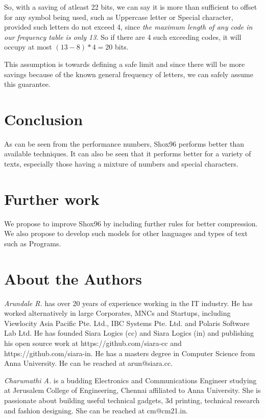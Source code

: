 \documentclass[]{article}
\begin{document}
So, with a saving of atleast 22 bits, we can say it is more than sufficient to offset for any symbol being used, such as Uppercase letter or Special character, provided such letters do not exceed 4, since \emph{the maximum length of any code in our frequency table is only 13}.  So if there are 4 such exceeding codes, it will occupy at most $(13 - 8) * 4 = 20$ bits.

This assumption is towards defining a safe limit and since there will be more savings because of the known general frequency of letters, we can safely assume this guarantee.

\section{Conclusion}

As can be seen from the performance numbers, Shox96 performs better than available techniques.  It can also be seen that it performs better for a variety of texts, especially those having a mixture of numbers and special characters.

\section{Further work}

We propose to improve Shox96 by including further rules for better compression.  We also propose to develop such models for other languages and types of text such as Programs.

\section{About the Authors}

\emph{Arundale R.} has over 20 years of experience working in the IT industry.  He has worked alternatively in large Corporates, MNCs and Startups, including Viewlocity Asia Pacific Pte. Ltd., IBC Systems Pte. Ltd. and Polaris Software Lab Ltd. He has founded Siara Logics (cc) and Siara Logics (in) and publishing his open source work at https://github.com/siara-cc and https://github.com/siara-in. He has a masters degree in Computer Science from Anna University.  He can be reached at arun@siara.cc.

\emph{Charumathi A.} is a budding Electronics and Communications Engineer studying at Jerusalem College of Engineering, Chennai affiliated to Anna University.  She is passionate about building useful technical gadgets, 3d printing, technical research and fashion designing.  She can be reached at cm@cm21.in.
\end{document}
